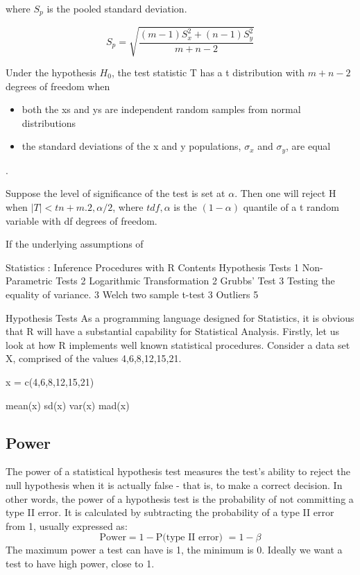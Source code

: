 where $S_{p}$ is the pooled standard deviation.

\begin{equation}
S_{p} = \sqrt{ \frac{(m-1)S^{2}_{x} +  (n-1)S^{2}_{y}}{m + n - 2}}
\end{equation}

Under the hypothesis $H_{0}$, the test statistic T has a t
distribution with $m + n - 2$ degrees of freedom when
\begin{itemize} \item both the xs and ys are independent random samples
from normal distributions \item the standard deviations of the x
and y populations, $\sigma_{x}$ and $\sigma_{y}$, are equal
\end{itemize}.

Suppose the level of significance of the test is set at $\alpha$.
Then one will reject H when $|T| < tn+m.2,\alpha/2$, where
$tdf,\alpha$ is the $(1 - \alpha)$ quantile of a t random variable
with df degrees of freedom.

If the underlying assumptions of

Statistics : Inference Procedures with R
Contents
Hypothesis Tests	1
Non-Parametric Tests	2
Logarithmic  Transformation	2
Grubbs’ Test	3
Testing the equality of variance.	3
Welch two sample t-test	3
Outliers	5

Hypothesis Tests
As a programming language designed for Statistics, it is obvious that R will have a substantial capability for Statistical Analysis.
Firstly, let us look at how R implements well known statistical procedures.  Consider a data set X, comprised of the values {4,6,8,12,15,21}.

x = c(4,6,8,12,15,21)

mean(x)
sd(x)
var(x)
mad(x)





\subsection{Power }
 The power of a statistical hypothesis test measures the test's ability to reject the null hypothesis when it is actually false - that is, to make a correct decision. In other words, the power of a hypothesis test is the probability of not committing a type II error. It is calculated by subtracting the probability of a type II error from 1, usually expressed as: 
\[\mbox{Power} = 1 - \mbox{P(type II error) } = 1- \beta \]The maximum power a test can have is 1, the minimum is 0. Ideally we want a test to have high power, close to 1.

